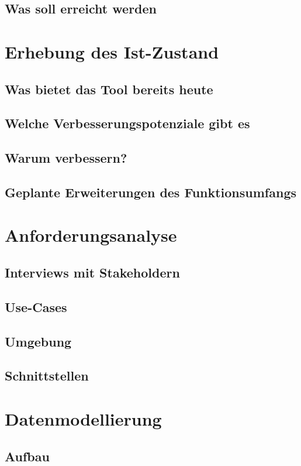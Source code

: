 \documentclass[12pt, titlepage]{article}
\begin{document}
\subsection{Was soll erreicht werden}

\newpage
\section{Erhebung des Ist-Zustand}
\subsection{Was bietet das Tool bereits heute}
\subsection{Welche Verbesserungspotenziale gibt es}
\subsection{Warum verbessern?}
\subsection{Geplante Erweiterungen des Funktionsumfangs}

\newpage
\section{Anforderungsanalyse}
\subsection{Interviews mit Stakeholdern}
\subsection{Use-Cases}
\subsection{Umgebung}
\subsection{Schnittstellen}

\newpage
\section{Datenmodellierung}
\subsection{Aufbau}
\end{document}
